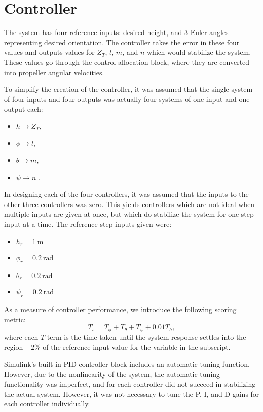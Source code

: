 \section*{Controller}

The system has four reference inputs: desired height, and 3 Euler angles representing desired orientation. The controller takes the error in these four values and outputs values for $Z_T$, $l$, $m$, and $n$ which would stabilize the system. These values go through the control allocation block, where they are converted into propeller angular velocities.

To simplify the creation of the controller, it was assumed that the single system of four inputs and four outputs was actually four systems of one input and one output each:
\begin{itemize}
    \item $h \rightarrow Z_T$,
    \item $\phi \rightarrow l$,
    \item $\theta \rightarrow m$,
    \item $\psi \rightarrow n$ .
\end{itemize}

In designing each of the four controllers, it was assumed that the inputs to the other three controllers was zero. This yields controllers which are not ideal when multiple inputs are given at once, but which do stabilize the system for one step input at a time. The reference step inputs given were:
\begin{itemize}
    \item $h_r = 1 ~ \text{m}$
    \item $\phi_r = 0.2 ~ \text{rad}$
    \item $\theta_r = 0.2 ~ \text{rad}$
    \item $\psi_r = 0.2 ~ \text{rad}$
\end{itemize}

As a measure of controller performance, we introduce the following scoring metric:
\begin{equation}
    T_s = T_\phi + T_\theta + T_\psi + 0.01T_h,
\end{equation}
where each $T$ term is the time taken until the system response settles into the region $\pm 2\%$ of the reference input value for the variable in the subscript.

Simulink's built-in PID controller block includes an automatic tuning function. However, due to the nonlinearity of the system, the automatic tuning functionality was imperfect, and for each controller did not succeed in stabilizing the actual system. However, it was not necessary to tune the P, I, and D gains for each controller individually.

